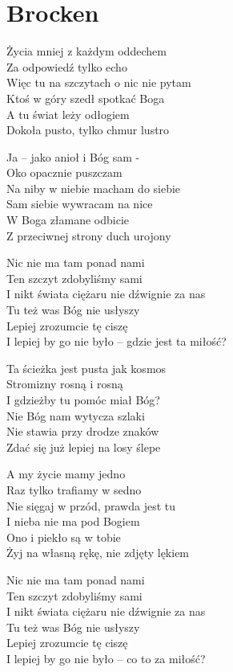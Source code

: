 \section{Brocken}
\begin{text}
    Życia mniej z każdym oddechem\\
    Za odpowiedź tylko echo\\
    Więc tu na szczytach o nic nie pytam\\
    Ktoś w góry szedł spotkać Boga\\
    A tu świat leży odłogiem\\
    Dokoła pusto, tylko chmur lustro

    Ja – jako anioł i Bóg sam -\\
    Oko opacznie puszczam\\
    Na niby w niebie macham do siebie\\
    Sam siebie wywracam na nice\\
    W Boga złamane odbicie\\
    Z przeciwnej strony duch urojony

    Nic nie ma tam ponad nami\\
    Ten szczyt zdobyliśmy sami\\
    I nikt świata ciężaru nie dźwignie za nas\\
    Tu też was Bóg nie usłyszy\\
    Lepiej zrozumcie tę ciszę\\
    I lepiej by go nie było – gdzie jest ta miłość?

    Ta ścieżka jest pusta jak kosmos\\
    Stromizny rosną i rosną\\
    I gdzieżby tu pomóc miał Bóg?\\
    Nie Bóg nam wytycza szlaki\\
    Nie stawia przy drodze znaków\\
    Zdać się już lepiej na losy ślepe

    A my życie mamy jedno\\
    Raz tylko trafiamy w sedno\\
    Nie sięgaj w przód, prawda jest tu\\
    I nieba nie ma pod Bogiem\\
    Ono i piekło są w tobie\\
    Żyj na własną rękę, nie zdjęty lękiem

    Nic nie ma tam ponad nami\\
    Ten szczyt zdobyliśmy sami\\
    I nikt świata ciężaru nie dźwignie za nas\\
    Tu też was Bóg nie usłyszy\\
    Lepiej zrozumcie tę ciszę\\
    I lepiej by go nie było – co to za miłość?
\end{text}
\begin{chord}
\end{chord}
